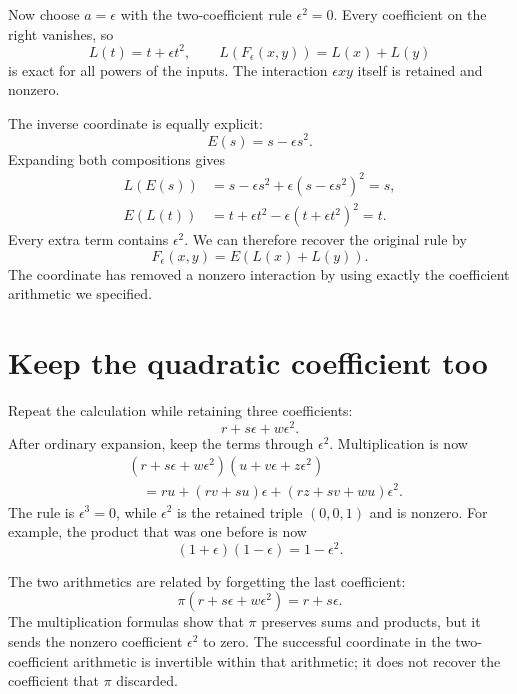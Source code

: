 Now choose \(a=\epsilon\) with the two-coefficient rule \(\epsilon^2=0\). Every coefficient on the right vanishes, so
\begin{equation}\label{eq:dual-repair}
 L(t)=t+\epsilon t^2,
 \qquad L(F_\epsilon(x,y))=L(x)+L(y)
\end{equation}
is exact for all powers of the inputs. The interaction \(\epsilon xy\) itself is retained and nonzero.

The inverse coordinate is equally explicit:
\[
 E(s)=s-\epsilon s^2.
\]
Expanding both compositions gives
\begin{align*}
 L(E(s))&=s-\epsilon s^2+\epsilon(s-\epsilon s^2)^2=s,\\
 E(L(t))&=t+\epsilon t^2-\epsilon(t+\epsilon t^2)^2=t.
\end{align*}
Every extra term contains \(\epsilon^2\). We can therefore recover the original rule by
\[
 F_\epsilon(x,y)=E(L(x)+L(y)).
\]
The coordinate has removed a nonzero interaction by using exactly the coefficient arithmetic we specified.

\section{Keep the quadratic coefficient too}\label{sec:next-order}

Repeat the calculation while retaining three coefficients:
\[
 r+s\epsilon+w\epsilon^2.
\]
After ordinary expansion, keep the terms through \(\epsilon^2\). Multiplication is now
\begin{equation}\label{eq:three-coefficients}
 \begin{split}
 &(r+s\epsilon+w\epsilon^2)(u+v\epsilon+z\epsilon^2)\\
 &\quad=ru+(rv+su)\epsilon+(rz+sv+wu)\epsilon^2.
 \end{split}
\end{equation}
The rule is \(\epsilon^3=0\), while \(\epsilon^2\) is the retained triple \((0,0,1)\) and is nonzero. For example, the product that was one before is now
\[
 (1+\epsilon)(1-\epsilon)=1-\epsilon^2.
\]

The two arithmetics are related by forgetting the last coefficient:
\[
 \pi(r+s\epsilon+w\epsilon^2)=r+s\epsilon.
\]
The multiplication formulas show that \(\pi\) preserves sums and products, but it sends the nonzero coefficient \(\epsilon^2\) to zero. The successful coordinate in the two-coefficient arithmetic is invertible within that arithmetic; it does not recover the coefficient that \(\pi\) discarded.

